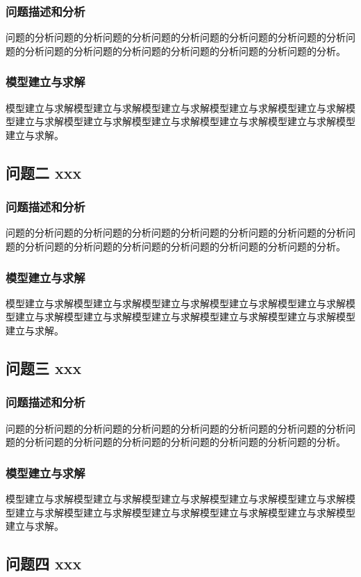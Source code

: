 \documentclass[bwprint]{gmcmthesis}
\begin{document}
\subsubsection{问题描述和分析}
问题的分析问题的分析问题的分析问题的分析问题的分析问题的分析问题的分析问题的分析问题的分析问题的分析问题的分析问题的分析问题的分析问题的分析。
\subsubsection{模型建立与求解}
模型建立与求解模型建立与求解模型建立与求解模型建立与求解模型建立与求解模型建立与求解模型建立与求解模型建立与求解模型建立与求解模型建立与求解模型建立与求解。


\subsection{问题二 xxx}
\subsubsection{问题描述和分析}
问题的分析问题的分析问题的分析问题的分析问题的分析问题的分析问题的分析问题的分析问题的分析问题的分析问题的分析问题的分析问题的分析问题的分析。
\subsubsection{模型建立与求解}
模型建立与求解模型建立与求解模型建立与求解模型建立与求解模型建立与求解模型建立与求解模型建立与求解模型建立与求解模型建立与求解模型建立与求解模型建立与求解。

\subsection{问题三 xxx}
\subsubsection{问题描述和分析}
问题的分析问题的分析问题的分析问题的分析问题的分析问题的分析问题的分析问题的分析问题的分析问题的分析问题的分析问题的分析问题的分析问题的分析。
\subsubsection{模型建立与求解}
模型建立与求解模型建立与求解模型建立与求解模型建立与求解模型建立与求解模型建立与求解模型建立与求解模型建立与求解模型建立与求解模型建立与求解模型建立与求解。

\subsection{问题四 xxx}
\end{document}
